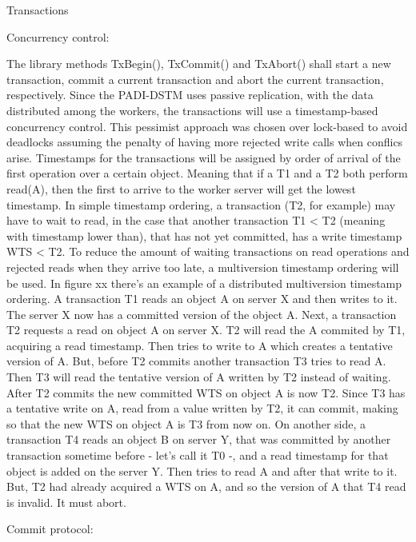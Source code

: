 \documentclass[times, 10pt,twocolumn]{article}
\begin{document}
Transactions

Concurrency control:

The library methods TxBegin(), TxCommit() and TxAbort() shall start a new transaction, commit a current transaction and abort the current transaction, respectively. Since the PADI-DSTM uses passive replication, with the data distributed among the workers, the transactions will use a timestamp-based concurrency control. This pessimist approach was chosen over lock-based to avoid deadlocks assuming the penalty of having more rejected write calls when conflics arise.
Timestamps for the transactions will be assigned by order of arrival of the first operation over a certain object. Meaning that if a T1 and a T2 both perform read(A), then the first to arrive to the worker server will get the lowest timestamp. In simple timestamp ordering, a transaction (T2, for example) may have to wait to read, in the case that another transaction T1 < T2 (meaning with timestamp lower than), that has not yet committed, has a write timestamp WTS < T2. To reduce the amount of waiting transactions on read operations and rejected reads when they arrive too late, a multiversion timestamp ordering will be used.
In figure xx there's an example of a distributed multiversion timestamp ordering. A transaction T1 reads an object A on server X and then writes to it. The server X now has a committed version of the object A. Next, a transaction T2 requests a read on object A on server X. T2 will read the A commited by T1, acquiring a read timestamp. Then tries to write to A which creates a tentative version of A. But, before T2 commits another transaction T3 tries to read A. Then T3 will read the tentative version of A written by T2 instead of waiting. After T2 commits the new committed WTS on object A is now T2. Since T3 has a tentative write on A, read from a value written by T2, it can commit, making so that the new WTS on object A is T3 from now on. On another side, a transaction T4 reads an object B on server Y, that was committed by another transaction sometime before - let's call it T0 -,  and a read timestamp for that object is added on the server Y. Then tries to read A and after that write to it. But, T2 had already acquired a WTS on A, and so the version of A that T4 read is invalid. It must abort.


Commit protocol:
\end{document}
